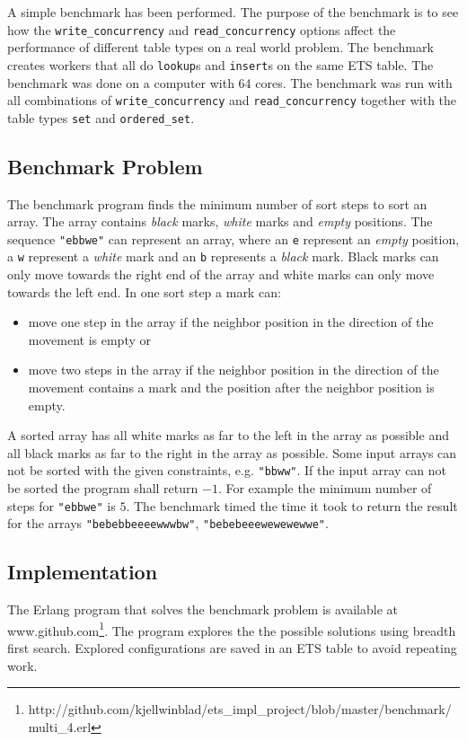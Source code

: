 \documentclass[aps,pre,preprint,nofootinbib]{revtex4}
\begin{document}
  A simple benchmark has been performed.
  The purpose of the benchmark is to see how the \verb|write_concurrency| and \verb|read_concurrency| options affect the performance of different table types on a real world problem.
  The benchmark creates workers that all do \verb|lookup|s and \verb|insert|s on the same ETS table.
  The benchmark was done on a computer with 64 cores.
  The benchmark was run with all combinations of \verb|write_concurrency| and \verb|read_concurrency| together with the table types \verb|set| and \verb|ordered_set|.
  
  \subsection{Benchmark Problem}
    The benchmark program finds the minimum number of sort steps to sort an array.
    The array contains \emph{black} marks, \emph{white} marks and \emph{empty} positions.
    The sequence \verb|"ebbwe"| can represent an array, where an \verb|e| represent an \emph{empty} position, a \verb|w| represent a \emph{white} mark and an \verb|b| represents a \emph{black} mark.
    Black marks can only move towards the right end of the array and white marks can only move towards the left end.
    In one sort step a mark can:
    \begin{itemize}
     \item move one step in the array if the neighbor position in the direction of the movement is empty or
     \item move two steps in the array if the neighbor position in the direction of the movement contains a mark and the position after the neighbor position is empty.
    \end{itemize}
    A sorted array has all white marks as far to the left in the array as possible and all black marks as far to the right in the array as possible.
    Some input arrays can not be sorted with the given constraints, e.g. \verb|"bbww"|.
    If the input array can not be sorted the program shall return $-1$.
    For example the minimum number of steps for \verb|"ebbwe"| is $5$.
    The benchmark timed the time it took to return the result for the arrays \verb|"bebebbeeeewwwbw"|, \verb|"bebebeeewewewewwe"|.
    
  \subsection{Implementation}
    The Erlang program that solves the benchmark problem is available at www.github.com\footnote{http://github.com/kjellwinblad/ets\_impl\_project/blob/master/benchmark/multi\_4.erl}.
    The program explores the the possible solutions using breadth first search.
    Explored configurations are saved in an ETS table to avoid repeating work.
    
\end{document}
